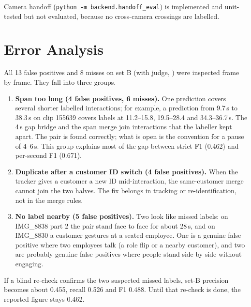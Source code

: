 Camera handoff (\texttt{python -m backend.handoff\_eval}) is implemented and unit-tested but not evaluated, because no cross-camera crossings are labelled.

\section{Error Analysis}
\label{sec:cveval-errors}
All 13 false positives and 8 misses on set B (with judge, ) were inspected frame by frame. They fall into three groups.
\begin{enumerate}
\item \textbf{Span too long (4 false positives, 6 misses).} One prediction covers several shorter labelled interactions; for example, a prediction from 9.7\,s to 38.3\,s on clip 155639 covers labels at 11.2--15.8, 19.5--28.4 and 34.3--36.7\,s. The 4\,s gap bridge and the span merge join interactions that the labeller kept apart. The pair is found correctly; what is open is the convention for a pause of 4--6\,s. This group explains most of the gap between strict F1 (0.462) and per-second F1 (0.671).
\item \textbf{Duplicate after a customer ID switch (4 false positives).} When the tracker gives a customer a new ID mid-interaction, the same-customer merge cannot join the two halves. The fix belongs in tracking or re-identification, not in the merge rules.
\item \textbf{No label nearby (5 false positives).} Two look like missed labels: on IMG\_8838 part 2 the pair stand face to face for about 28\,s, and on IMG\_8830 a customer gestures at a seated employee. One is a genuine false positive where two employees talk (a role flip or a nearby customer), and two are probably genuine false positives where people stand side by side without engaging.
\end{enumerate}
If a blind re-check confirms the two suspected missed labels, set-B precision becomes about 0.455, recall 0.526 and F1 0.488. Until that re-check is done, the reported figure stays 0.462.


